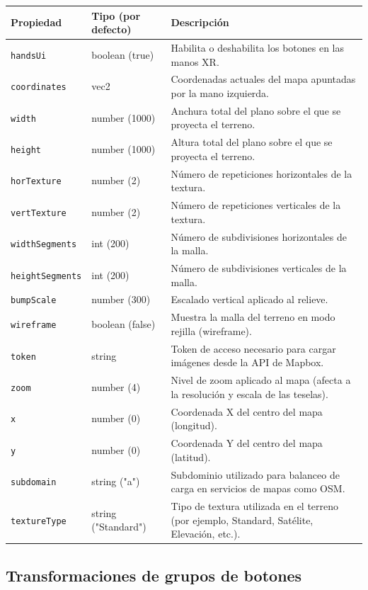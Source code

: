 \documentclass[a4paper, 12pt]{book}
\begin{document}
\begin{table}[H]
\centering
\begin{tabular}{|l|l|p{9cm}|}
\hline
\textbf{Propiedad} & \textbf{Tipo (por defecto)} & \textbf{Descripción} \\
\hline
\texttt{handsUi} & boolean (true) & Habilita o deshabilita los botones en las manos XR. \\
\texttt{coordinates} & vec2 & Coordenadas actuales del mapa apuntadas por la mano izquierda. \\
\texttt{width} & number (1000) & Anchura total del plano sobre el que se proyecta el terreno. \\
\texttt{height} & number (1000) & Altura total del plano sobre el que se proyecta el terreno. \\
\texttt{horTexture} & number (2) & Número de repeticiones horizontales de la textura. \\
\texttt{vertTexture} & number (2) & Número de repeticiones verticales de la textura. \\
\texttt{widthSegments} & int (200) & Número de subdivisiones horizontales de la malla. \\
\texttt{heightSegments} & int (200) & Número de subdivisiones verticales de la malla. \\
\texttt{bumpScale} & number (300) & Escalado vertical aplicado al relieve. \\
\texttt{wireframe} & boolean (false) & Muestra la malla del terreno en modo rejilla (wireframe). \\
\texttt{token} & string & Token de acceso necesario para cargar imágenes desde la API de Mapbox. \\
\texttt{zoom} & number (4) & Nivel de zoom aplicado al mapa (afecta a la resolución y escala de las teselas). \\
\texttt{x} & number (0) & Coordenada X del centro del mapa (longitud). \\
\texttt{y} & number (0) & Coordenada Y del centro del mapa (latitud). \\
\texttt{subdomain} & string ("a") & Subdominio utilizado para balanceo de carga en servicios de mapas como OSM. \\
\texttt{textureType} & string ("Standard") & Tipo de textura utilizada en el terreno (por ejemplo, Standard, Satélite, Elevación, etc.). \\
\hline
\end{tabular}
\end{table}

\subsection*{Transformaciones de grupos de botones}
\end{document}
